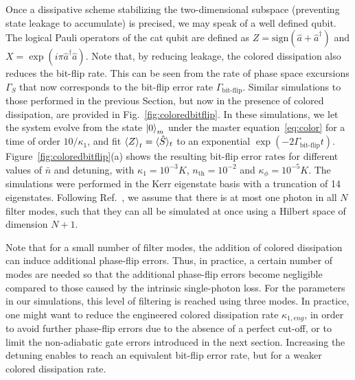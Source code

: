 \documentclass[%
 reprint,
 superscriptaddress,
 amsmath,
 amssymb,
 aps,
 pra,
 10pt
]{revtex4-2}
\newcommand{\adag}{\hat{a}^\dagger}
\newcommand{\hata}{\hat{a}}
\begin{document}
Once a dissipative scheme stabilizing the two-dimensional subspace (preventing state leakage to accumulate) is precised, we may speak of a well defined qubit. The logical Pauli operators of the cat qubit are defined as $Z=\text{sign}(\hata+\adag)$ and $X=\exp(i\pi\adag\hata)$. Note that, by reducing leakage, the colored dissipation also reduces the bit-flip rate. This can be seen from the rate of phase space excursions $\Gamma_S$ that now corresponds to the bit-flip error rate $\Gamma_\text{bit-flip}$. Similar simulations to those performed in the previous Section, but now in the presence of colored dissipation, are provided in Fig.~\ref{fig:coloredbitflip}. In these simulations, we let the system evolve from the state $\ket{0}_m$ under the master equation~\eqref{eq:color} for a time of order $10/\kappa_1$, and fit $\expval{Z}_t=\langle \hat S \rangle_t$ to an exponential $\exp(-2\Gamma_{\text{bit-flip}}t)$. Figure~\ref{fig:coloredbitflip}(a) shows the resulting bit-flip error rates for different values of $\bar{n}$ and detuning, with $\kappa_1 = 10^{-3}K$, $n_{\text{th}} = 10^{-2}$ and $\kappa_\phi = 10^{-5}K$. The simulations were performed in the Kerr eigenstate basis with a truncation of 14 eigenstates. Following Ref.~\cite{Putterman2022}, we assume that there is at most one photon in all $N$ filter modes, such that they can all be simulated at once using a Hilbert space of dimension $N+1$.

Note that for a small number of filter modes, the addition of colored dissipation can induce additional phase-flip errors. Thus, in practice, a certain number of modes are needed so that the additional phase-flip errors become negligible compared to those caused by the intrinsic single-photon loss. For the parameters in our simulations, this level of filtering is reached using three modes. In practice, one might want to reduce the engineered colored dissipation rate $\kappa_{1,eng}$, in order to avoid further phase-flip errors due to the absence of a perfect cut-off, or to limit the non-adiabatic gate errors introduced in the next section. Increasing the detuning enables to reach an equivalent bit-flip error rate, but for a weaker colored dissipation rate.
\end{document}
